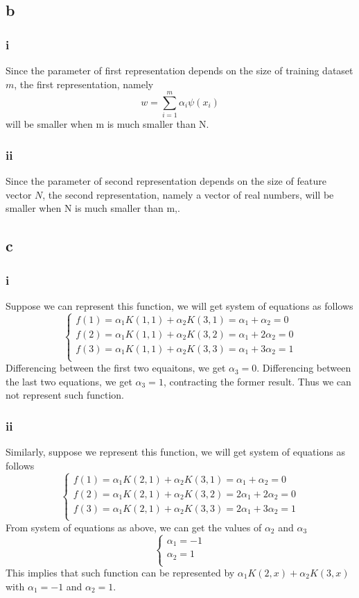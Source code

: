\documentclass{article}
\begin{document}
	\subsection{b}
	\subsubsection{i}
	Since the parameter of first representation depends on the size of training dataset $m$, the first representation, namely 
	$$
	w = \sum_{i=1}^{m}\alpha_i\psi(x_i)
	$$ 
	will be smaller when m is much smaller than N.
	\subsubsection{ii}
	Since the parameter of second representation depends on the size of feature vector $N$, the second representation, namely a vector of real numbers, will be smaller when N is much smaller than m,. 
	\subsection{c}
	\subsubsection{i}
	Suppose we can represent this function, we will get system of equations as follows
	$$
	\begin{cases}
	f(1)=\alpha_1K(1,1)+\alpha_2K(3,1)=\alpha_1+\alpha_2=0\\
	f(2)=\alpha_1K(1,1)+\alpha_2K(3,2)=\alpha_1+2\alpha_2=0\\
	f(3)=\alpha_1K(1,1)+\alpha_2K(3,3)=\alpha_1+3\alpha_2=1\\
	\end{cases}
	$$
	Differencing between the first two equaitons, we get $\alpha_3=0$.
	Differencing between the last two equations, we get $\alpha_3=1$, contracting the former result.
	Thus we can not represent such function.
	\subsubsection{ii}
	Similarly, suppose we represent this function, we will get system of equations as follows
	$$
	\begin{cases}
	f(1)=\alpha_1K(2,1)+\alpha_2K(3,1)=\alpha_1+\alpha_2=0\\
	f(2)=\alpha_1K(2,1)+\alpha_2K(3,2)=2\alpha_1+2\alpha_2=0\\
	f(3)=\alpha_1K(2,1)+\alpha_2K(3,3)=2\alpha_1+3\alpha_2=1\\
	\end{cases}
	$$
	From system of equations as above, we can get the values of $\alpha_2$ and $\alpha_3$
	$$
	\begin{cases}
	\alpha_1 = -1\\
	\alpha_2 = 1\\
	\end{cases}
	$$
	This implies that such function can be represented by $\alpha_1K(2,x)+\alpha_2K(3,x)$ with $\alpha_1=-1$ and $\alpha_2=1$.
\end{document}

